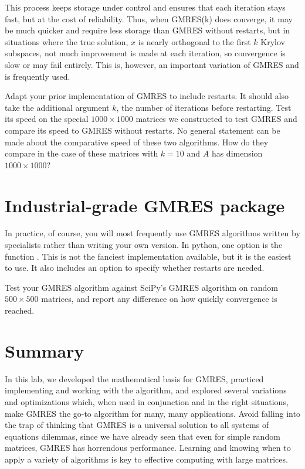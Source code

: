 This process keeps storage under control and ensures that each iteration stays fast, but at the cost of reliability.
Thus, when GMRES(k) does converge, it may be much quicker and require less storage than GMRES without restarts, but in situations where the true solution, $x$ is nearly orthogonal to the first $k$ Krylov subspaces, not much improvement is made at each iteration, so convergence is slow or may fail entirely.
This is, however, an important variation of GMRES and is frequently used.

\begin{problem}
Adapt your prior implementation of GMRES to include restarts.
It should also take the additional argument $k$, the number of iterations before restarting.
Test its speed on the special $1000\times 1000$ matrices we constructed to test GMRES and compare its speed to GMRES without restarts.
No general statement can be made about the comparative speed of these two algorithms.
How do they compare in the case of these matrices with $k=10$ and $A$ has dimension $1000\times 1000$?
\label{prob:GMRES3}
\end{problem}

\section*{Industrial-grade GMRES package}
In practice, of course, you will most frequently use GMRES algorithms written by specialists rather than writing your own version.
In python, one option is the function .
This is not the fanciest implementation available, but it is the easiest to use.
It also includes an option to specify whether restarts are needed.

\begin{problem}
Test your GMRES algorithm against SciPy's GMRES algorithm on random $500\times 500$ matrices, and report any difference on how quickly convergence is reached.
\label{prob:GMRES4}
\end{problem}

\section*{Summary}
In this lab, we developed the mathematical basis for GMRES, practiced implementing and working with the algorithm, and explored several variations and optimizations which, when used in conjunction and in the right situations, make GMRES the go-to algorithm for many, many applications.
Avoid falling into the trap of thinking that GMRES is a universal solution to all systems of equations dilemmas, since we have already seen that even for simple random matrices, GMRES has horrendous performance.
Learning and knowing when to apply a variety of algorithms is key to effective computing with large matrices.
